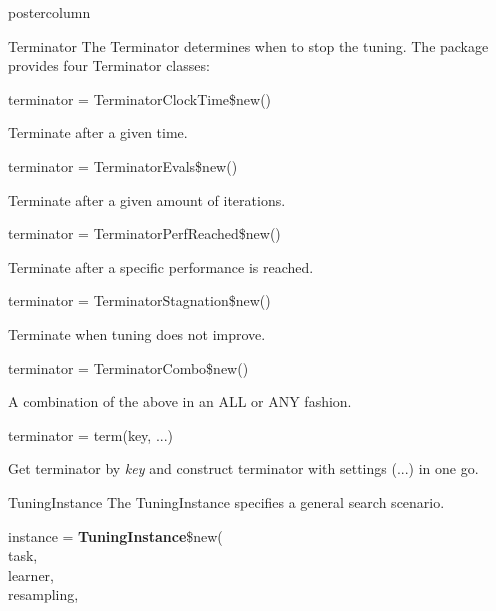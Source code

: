 \documentclass{beamer}
\newlength{\columnheight} %
\begin{document}
\begin{frame}[fragile]{}
\begin{columns}
\begin{column}{.245\textwidth}
\begin{beamercolorbox}[center]{postercolumn}
				\begin{minipage}{.98\textwidth}
					\parbox[t][\columnheight]{\textwidth}{
						\begin{myblock}{Terminator}
						The Terminator determines when to stop the tuning. The package provides four Terminator classes:
						\\
						\begin{codebox}
							terminator = TerminatorClockTime\$new()
						\end{codebox}
						Terminate after a given time.
						\\
						\begin{codebox}
							terminator = TerminatorEvals\$new()
						\end{codebox}
						Terminate after a given amount of iterations. 
						\\
						\begin{codebox}
							terminator = TerminatorPerfReached\$new()
						\end{codebox}
						Terminate after a specific performance is reached.  
						\\
						\begin{codebox}
							terminator = TerminatorStagnation\$new()
						\end{codebox}
						Terminate when tuning does not improve.
						\\
						\begin{codebox}
							terminator = TerminatorCombo\$new()
						\end{codebox}
						A combination of the above in an ALL or ANY fashion.
						\\
						\begin{codebox}
							terminator = term(key, ...)
						\end{codebox}
						Get terminator by \textit{key} and construct terminator with settings (...) in one go. 
					\end{myblock}	
				\begin{myblock}{TuningInstance}
					The TuningInstance specifies a general search scenario.
					\\
					\begin{codeboxmultiline}[width=18cm]
						instance = \textbf{TuningInstance}\$new(\\
						\hspace*{1ex}task,\\
						\hspace*{1ex}learner,\\
						\hspace*{1ex}resampling,\\

\end{codeboxmultiline}
\end{myblock}}
\end{minipage}
\end{beamercolorbox}
\end{column}
\end{columns}
\end{frame}
\end{document}
